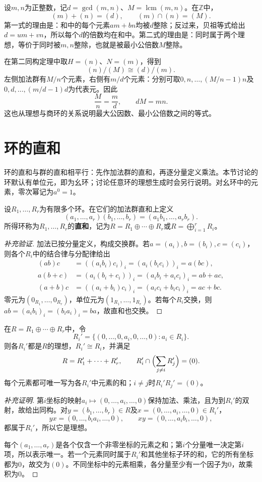 \begin{example}
设$m,n$为正整数，记$d=\gcd(m,n)$、$M=\operatorname{lcm}(m,n)$。在$\mathbb Z$中，
\[
(m)+(n)=(d),\qquad(m)\cap(n)=(M).
\]
第一式的理由是：和中的每个元素$am+bn$均被$d$整除；反过来，贝祖等式给出$d=um+vn$，所以每个$d$的倍数均在和中。第二式的理由是：同时属于两个理想，等价于同时被$m,n$整除，也就是被最小公倍数$M$整除。

在第二同构定理中取$H=(n)$、$N=(m)$，得到
\[
(n)/(M)\cong(d)/(m).
\]
左侧加法群有$M/n$个元素，右侧有$m/d$个元素：分别可取$0,n,\ldots,(M/n-1)n$及$0,d,\ldots,(m/d-1)d$为代表元。因此
\[
\frac Mn=\frac md,\qquad dM=mn.
\]
这也从理想与商环的关系说明最大公因数、最小公倍数之间的等式。
\end{example}


\section{环的直和}

环的直和与群的直和相平行：先作加法群的直和，再逐分量定义乘法。本节讨论的环默认有单位元，即为幺环；讨论任意环的理想生成时会另行说明。对幺环中的元素，零次幂记为$a^0=1$。

\begin{definition}
设$R_1,\ldots,R_r$为有限多个环。在它们的加法群直和上定义
\[
(a_1,\ldots,a_r)(b_1,\ldots,b_r)=(a_1b_1,\ldots,a_rb_r).
\]
所得环称为$R_1,\ldots,R_r$的\textbf{直和}，记为$R=R_1\oplus\cdots\oplus R_r$或$R=\bigoplus_{i=1}^rR_i$。
\end{definition}
\begin{proof}[补充验证]
加法已按分量定义，构成交换群。若$a=(a_i),b=(b_i),c=(c_i)$，则各个$R_i$中的结合律与分配律给出
\begin{align*}
(ab)c&=((a_ib_i)c_i)_i=(a_i(b_ic_i))_i=a(bc),\\
a(b+c)&=(a_i(b_i+c_i))_i=(a_ib_i+a_ic_i)_i=ab+ac,\\
(a+b)c&=((a_i+b_i)c_i)_i=(a_ic_i+b_ic_i)_i=ac+bc.
\end{align*}
零元为$(0_{R_1},\ldots,0_{R_r})$，单位元为$(1_{R_1},\ldots,1_{R_r})$。若每个$R_i$交换，则$ab=(a_ib_i)_i=(b_ia_i)_i=ba$，故直和也交换。
\end{proof}

\begin{proposition}
在$R=R_1\oplus\cdots\oplus R_r$中，令
\[
R_i'=\{(0,\ldots,0,a_i,0,\ldots,0):a_i\in R_i\}.
\]
则各$R_i'$都是$R$的理想，$R_i'\cong R_i$，并满足
\[
R=R_1'+\cdots+R_r',\qquad
R_i'\cap\Bigl(\sum_{j\ne i}R_j'\Bigr)=(0).
\]
每个元素都可唯一写为各$R_i'$中元素的和；$i\ne j$时$R_i'R_j'=(0)$。
\end{proposition}
\begin{proof}[补充证明]
第$i$坐标的映射$a_i\mapsto(0,\ldots,a_i,\ldots,0)$保持加法、乘法，且为到$R_i'$的双射，故给出同构。对$y=(b_1,\ldots,b_r)\in R$及$x=(0,\ldots,a_i,\ldots,0)\in R_i'$，
\[
yx=(0,\ldots,b_ia_i,\ldots,0),\qquad
xy=(0,\ldots,a_ib_i,\ldots,0),
\]
都属于$R_i'$，所以它是理想。

每个$(a_1,\ldots,a_r)$是各个仅含一个非零坐标的元素之和；第$i$个分量唯一决定第$i$项，所以表示唯一。若一个元素同时属于$R_i'$和其他坐标子环的和，它的所有坐标都为0，故交为$(0)$。不同坐标中的元素相乘，各分量至少有一个因子为0，故乘积为0。
\end{proof}


